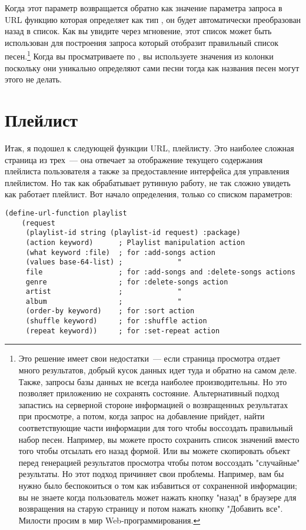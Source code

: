Когда этот параметр возвращается обратно как значение параметра запроса  в
URL функцию которая определяет  как тип , он будет
автоматически преобразован назад в список. Как вы увидите через мгновение, этот список
может быть использован для построения запроса который отобразит правильный список
песен.\footnote{Это решение имеет свои недостатки~--- если страница просмотра отдает много
    результатов, добрый кусок данных идет туда и обратно на самом деле. Также, запросы
    базы данных не всегда наиболее производительны. Но это позволяет приложению не
    сохранять состояние. Альтернативный подход запастись на серверной стороне информацией
    о возвращенных результатах при просмотре, а потом, когда запрос на добавление прийдет,
    найти соответствующие части информации для того чтобы воссоздать правильный набор
    песен. Например, вы можете просто сохранить список значений вместо того чтобы отсылать
    его назад формой. Или вы можете скопировать объект  перед
    генерацией результатов просмотра чтобы потом воссоздать "случайные" результаты. Но
    этот подход причиняет свои проблемы. Например, вам бы нужно было беспокоиться о том
    как избавиться от сохраненной информации; вы не знаете когда пользователь может нажать
    кнопку "назад" в браузере для возвращения на старую страницу и потом нажать кнопку
"Добавить все". Милости просим в мир Web-программирования.} Когда вы просматриваете по
, вы используете значения из колонки  поскольку они уникально
определяют сами песни тогда как названия песен могут этого не делать.

\section{Плейлист}

Итак, я подошел к следующей функции URL, плейлисту. Это наиболее сложная страница из
трех~--- она отвечает за отображение текущего содержания плейлиста пользователя а также за
предоставление интерфейса для управления плейлистом. Но так как 
обрабатывает рутинную работу, не так сложно увидеть как работает плейлист. Вот начало
определения, только со списком параметров: 

\begin{lstlisting}
(define-url-function playlist 
    (request
     (playlist-id string (playlist-id request) :package)
     (action keyword)      ; Playlist manipulation action
     (what keyword :file)  ; for :add-songs action
     (values base-64-list) ;             "
     file                  ; for :add-songs and :delete-songs actions
     genre                 ; for :delete-songs action
     artist                ;             "
     album                 ;             "
     (order-by keyword)    ; for :sort action
     (shuffle keyword)     ; for :shuffle action
     (repeat keyword))     ; for :set-repeat action
\end{lstlisting}

